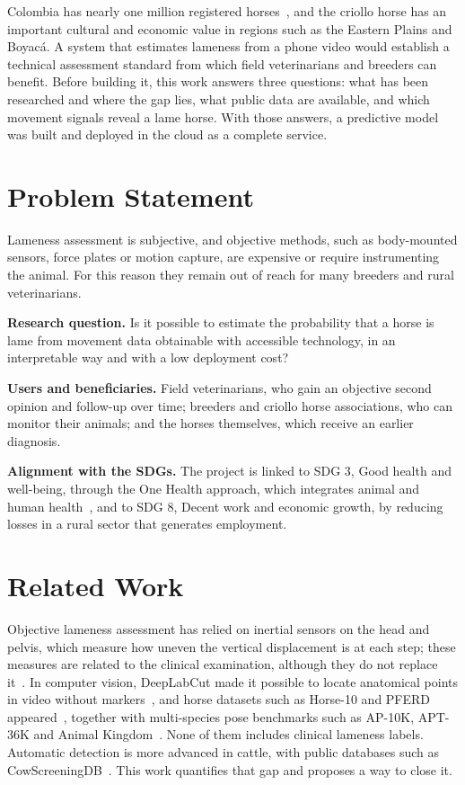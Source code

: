 \documentclass[conference,a4paper]{IEEEtran}
\begin{document}
Colombia has nearly one million registered horses~\cite{agronegocios2025censo}, and the criollo horse has an important cultural and economic value in regions such as the Eastern Plains and Boyacá. A system that estimates lameness from a phone video would establish a technical assessment standard from which field veterinarians and breeders can benefit. Before building it, this work answers three questions: what has been researched and where the gap lies, what public data are available, and which movement signals reveal a lame horse. With those answers, a predictive model was built and deployed in the cloud as a complete service.

\section{Problem Statement}

Lameness assessment is subjective, and objective methods, such as body-mounted sensors, force plates or motion capture, are expensive or require instrumenting the animal. For this reason they remain out of reach for many breeders and rural veterinarians.

\textbf{Research question.} Is it possible to estimate the probability that a horse is lame from movement data obtainable with accessible technology, in an interpretable way and with a low deployment cost?

\textbf{Users and beneficiaries.} Field veterinarians, who gain an objective second opinion and follow-up over time; breeders and criollo horse associations, who can monitor their animals; and the horses themselves, which receive an earlier diagnosis.

\textbf{Alignment with the SDGs.} The project is linked to SDG 3, Good health and well-being, through the One Health approach, which integrates animal and human health~\cite{un2015}, and to SDG 8, Decent work and economic growth, by reducing losses in a rural sector that generates employment.

\section{Related Work}

Objective lameness assessment has relied on inertial sensors on the head and pelvis, which measure how uneven the vertical displacement is at each step; these measures are related to the clinical examination, although they do not replace it~\cite{keegan2013}. In computer vision, DeepLabCut made it possible to locate anatomical points in video without markers~\cite{mathis2018}, and horse datasets such as Horse-10 and PFERD appeared~\cite{mathis2021,li2024pferd}, together with multi-species pose benchmarks such as AP-10K, APT-36K and Animal Kingdom~\cite{yu2021ap10k,yang2022apt36k,ng2022animalkingdom}. None of them includes clinical lameness labels. Automatic detection is more advanced in cattle, with public databases such as CowScreeningDB~\cite{ismail2024cow}. This work quantifies that gap and proposes a way to close it.
\end{document}
